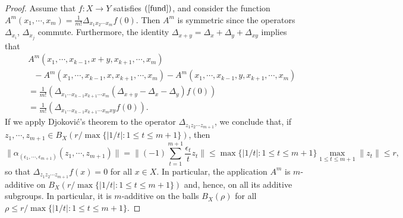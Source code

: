 \documentclass[12pt,a4paper]{amsart}
\theoremstyle{definition}
\begin{document}
\begin{proof}  Assume that $f:X\to Y$ satisfies $(\ref{fund})$, and consider the function $A^m(x_1,\cdots,x_m)=\frac{1}{m!}\Delta_{x_1x_2\cdots x_m}f(0)$. Then $A^m$ is symmetric since the operators $\Delta_{x_i}$, $\Delta_{x_j}$ commute. Furthermore, the identity $\Delta_{x+y}=\Delta_x+\Delta_y+\Delta_{xy}$ implies that 
\begin{eqnarray*}
&\ &A^m(x_1,\cdots,x_{k-1},x+y,x_{k+1},\cdots,x_m) \\
&\ & \ \ \ -A^m(x_1,\cdots,x_{k-1},x,x_{k+1},\cdots,x_m)-A^m(x_1,\cdots,x_{k-1},y,x_{k+1},\cdots,x_m)\\
&\ & = \frac{1}{m!}\left(\Delta_{x_1\cdots x_{k-1}x_{k+1}\cdots x_m}(\Delta_{x+y}-\Delta_x-\Delta_y)f(0) \right)\\
&\ & = \frac{1}{m!}\left(\Delta_{x_1 \cdots x_{k-1}x_{k+1}\cdots x_mxy}f(0) \right).
\end{eqnarray*}  
If we apply Djokovi\'{c}'s theorem to the operator $\Delta_{z_1z_2\cdots z_{m+1}}$, we conclude that, if $z_1,\cdots,z_{m+1}\in B_X(r/\max\{|1/t|:1\leq t\leq m+1\})$, then 
\[
\|\alpha_{(\epsilon_1,\cdots,\epsilon_{m+1})}(z_1,\cdots,z_{m+1})\|=\|(-1)\sum_{t=1}^{m+1}\frac{\epsilon_t}{t}z_t\|\leq \max\{|1/t|:1\leq t\leq m+1\}\max_{1\leq t\leq m+1}\|z_t\|\leq r,
\]
so that $\Delta_{z_1z_2\cdots z_{m+1}}f(x)=0$ for all $x\in X$. In particular, the application $A^m$ is $m$-additive on $B_{X}(r/\max\{|1/t|:1\leq t\leq m+1\})$ and, hence, on all its additive subgroups. In particular, it is $m$-additive on the balls $B_X(\rho)$ for all $\rho \leq r/\max\{|1/t|:1\leq t\leq m+1\}$. 


\end{proof}
\end{document}
